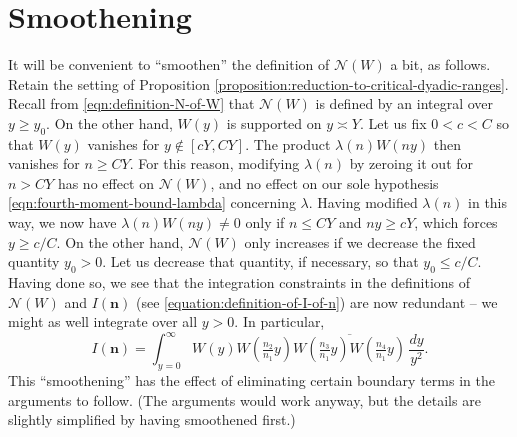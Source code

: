 \documentclass[reqno]{amsart} 
\begin{document}
\section{Smoothening}\label{sec:cqx50az5wn}
It will be convenient to ``smoothen'' the definition of $\mathcal{N}(W)$ a bit, as follows.  Retain the setting of Proposition \ref{proposition:reduction-to-critical-dyadic-ranges}.  Recall from \eqref{eqn:definition-N-of-W} that $\mathcal{N}(W)$ is defined by an integral over $y \geq y_0$.  On the other hand, $W(y)$ is supported on $y \asymp Y$.  Let us fix $0 < c < C$ so that $W(y)$ vanishes for $y \notin [c Y, C Y ]$.  The product $\lambda(n) W(n y)$ then vanishes for $n \geq C Y$.  For this reason, modifying $\lambda(n)$ by zeroing it out for $n > C Y$ has no effect on $\mathcal{N}(W)$, and no effect on our sole hypothesis \eqref{eqn:fourth-moment-bound-lambda} concerning $\lambda$.  Having modified $\lambda(n)$ in this way, we now have $\lambda(n) W(n y) \neq 0$ only if $n \leq C Y$ and $n y \geq c Y$, which forces $y \geq c/C$.  On the other hand, $\mathcal{N}(W)$ only increases if we decrease the fixed quantity $y_0 > 0$.  Let us decrease that quantity, if necessary, so that $y_0 \leq c/C$.  Having done so, we see that the integration constraints in the definitions of $\mathcal{N}(W)$ and $I(\mathbf{n})$ (see \eqref{equation:definition-of-I-of-n}) are now redundant -- we might as well integrate over all $y > 0$.  In particular,
\begin{equation*}
  I(\mathbf{n}) = \int _{y = 0 } ^\infty W (y ) W (\tfrac{n_2}{n _1} y) \overline{W (\tfrac{n _3 }{ n _1 } y) W (\tfrac{n _4}{n_1} y)} \, \frac{d y}{y^2}.
\end{equation*}
This ``smoothening'' has the effect of eliminating certain boundary terms in the arguments to follow.  (The arguments would work anyway, but the details are slightly simplified by having smoothened first.)
\end{document}
